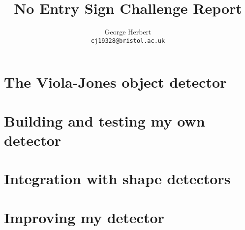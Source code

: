 \documentclass[onecolumn, 11pt, a4paper]{article}
\author{
  George Herbert\\
  \texttt{cj19328@bristol.ac.uk}
}
\title{No Entry Sign Challenge Report}
\begin{document}
\maketitle


\section{The Viola-Jones object detector}

\section{Building and testing my own detector}

\section{Integration with shape detectors}

\section{Improving my detector}



\clearpage
\begin{thebibliography}{9}
\end{thebibliography}
    
\end{document}
